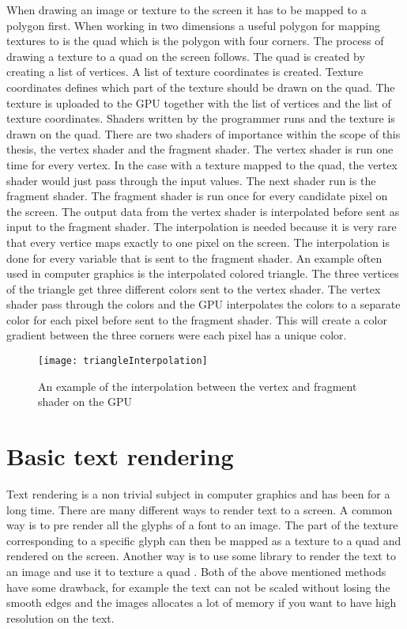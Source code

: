When drawing an image or texture to the screen it has to be mapped to a polygon first. When working in two dimensions a useful polygon for mapping textures to is the quad which is the polygon with four corners. The process of drawing a texture to a quad on the screen follows. The quad is created by creating a list of vertices. A list of texture coordinates is created. Texture coordinates defines which part of the texture should be drawn on the quad. The texture is uploaded to the GPU together with the list of vertices and the list of texture coordinates. Shaders written by the programmer runs and the texture is drawn on the quad. There are two shaders of importance within the scope of this thesis, the vertex shader and the fragment shader. The vertex shader is run one time for every vertex. In the case with a texture mapped to the quad, the vertex shader would just pass through the input values. The next shader run is the fragment shader. The fragment shader is run once for every candidate pixel on the screen. The output data from the vertex shader is interpolated before sent as input to the fragment shader. The interpolation is needed because it is very rare that every vertice maps exactly to one pixel on the screen. The interpolation is done for every variable that is sent to the fragment shader. An example often used in computer graphics is the interpolated colored triangle. The three vertices of the triangle get three different colors sent to the vertex shader. The vertex shader pass through the colors and the GPU interpolates the colors to a separate color for each pixel before sent to the fragment shader. This will create a color gradient between the three corners were each pixel has a unique color. 
\begin{figure}[H]
\centerline{\texttt{[image: triangleInterpolation]}}
\caption{An example of the interpolation between the vertex and fragment shader on the GPU}
\end{figure}
\section{Basic text rendering}\label{textrendering}
Text rendering is a non trivial subject in computer graphics and has been for a long time. There are many different ways to render text to a screen. A common way is to pre render all the glyphs of a font to an image. The part of the texture corresponding to a specific glyph can then be mapped as a texture to a quad and rendered on the screen. Another way is to use some library to render the text to an image and use it to texture a quad \citep{FreeType}. Both of the above mentioned methods have some drawback, for example the text can not be scaled without losing the smooth edges and the images allocates a lot of memory if you want to have high resolution on the text.

